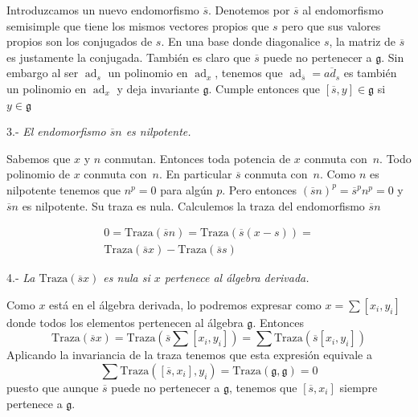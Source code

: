 \documentclass[a4paper,draft,12pt]{scrartcl}
\newcommand{\g}{\mathfrak{g}}%
\DeclareMathOperator{\ad}{ad}  %
\begin{document}
 Introduzcamos un nuevo endomorfismo $\overline{s}$.  Denotemos por $\overline{s}$ al endomorfismo semisimple que tiene los mismos vectores propios que $s$ pero que sus valores propios son los conjugados de $s$.  En una base donde diagonalice $s$, la matriz de $\overline{s}$ es justamente la conjugada.  También es claro que $\overline{s}$ puede no pertenecer a $\g$.  Sin embargo al ser $\ad_s$ un polinomio en $\ad_x$, tenemos que $\ad_{\overline{s}}= \overline{ad_s}$ es también un polinomio en $\ad_x$ y deja invariante $\g$.  Cumple entonces que $[\overline{s},y]\in \g$ si $y\in \g$
 
 \bigskip
 
 3.- \textit{El endomorfismo $\overline{s}n$ es nilpotente.}
 

   
  Sabemos que $x$ y $n$ conmutan.  Entonces toda potencia de $x$ conmuta con~$n$.  Todo polinomio de $x$ conmuta con~$n$. En particular $\overline{s}$ conmuta con~$n$.  Como $n$ es nilpotente tenemos que $n^p=0$ para algún $p$.  Pero entonces $(\overline{s}n)^p = \overline{s}^pn^p=0$ y $\overline{s}n$ es nilpotente. Su traza es nula.  Calculemos la traza del endomorfismo $\overline{s}n$
  
  
  
\begin{equation}\nonumber
\begin{split}
 0=\mathrm{Traza}(\overline{s}n) = \mathrm{Traza}(\overline{s}(x-s))= \\
 \mathrm{Traza}(\overline{s}x) -\mathrm{Traza}(\overline{s}s) 
  \end{split}
  \end{equation}
  
  \bigskip
  
  4.- \textit{La  $\mathrm{Traza}(\overline{s}x)$ es nula si $x$ pertenece al álgebra derivada.}
  
    Como $x$ está en el álgebra derivada, lo podremos expresar como $x = \sum [x_i,y_i]$ donde todos los elementos pertenecen al álgebra $\g$.  Entonces
 $$
\textstyle \mathrm{Traza}(\overline{s}x) = \mathrm{Traza}(\overline{s}\sum[x_i,y_i]) = \sum\mathrm{Traza}(\overline{s}[x_i,y_i])
 $$
 Aplicando la invariancia de la traza tenemos que esta expresión equivale a 
 $$
 \textstyle \sum\mathrm{Traza}([\overline{s},x_i], y_i)= \mathrm{Traza}(\g,\g)=0
 $$
 puesto que aunque $\overline{s}$ puede no pertenecer a $\g$, tenemos que $[\overline{s},x_i]$ siempre pertenece a $\g$.
 
 \bigskip
 
\end{document}
